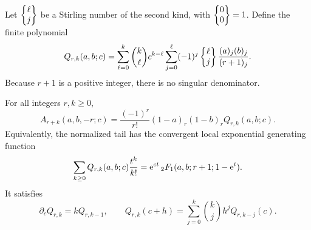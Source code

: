 Let $\left\{\begin{matrix}\ell\\j\end{matrix}\right\}$ be a Stirling number of the second kind, with
$\left\{\begin{matrix}0\\0\end{matrix}\right\}=1$. Define the finite polynomial
\begin{equation}\label{agrc:Q-definition}
 Q_{r,k}(a,b;c)=\sum_{\ell=0}^k\binom{k}{\ell}c^{k-\ell}
       \sum_{j=0}^{\ell}(-1)^j\left\{\begin{matrix}\ell\\j\end{matrix}\right\}
                 \frac{(a)_j(b)_j}{(r+1)_j}.
\end{equation}
Because $r+1$ is a positive integer, there is no singular denominator.

\begin{theorem}
\label{agrc:tail}
For all integers $r,k\geq0$,
\begin{equation}\label{agrc:tail-formula}
 \boxed{\displaystyle
 A_{r+k}(a,b,-r;c)=
 \frac{(-1)^r}{r!}(1-a)_r(1-b)_r Q_{r,k}(a,b;c).}
\end{equation}
Equivalently, the normalized tail has the convergent local exponential
 generating function
\begin{equation}\label{agrc:tail-hypergeometric}
 \sum_{k\geq0}Q_{r,k}(a,b;c)\frac{t^k}{k!}
       =\mathrm e^{ct}\,{}_2F_1(a,b;r+1;1-\mathrm e^t).
\end{equation}
It satisfies
\begin{equation}\label{agrc:Appell}
 \partial_c Q_{r,k}=kQ_{r,k-1},\qquad
 Q_{r,k}(c+h)=\sum_{j=0}^k\binom{k}{j}h^jQ_{r,k-j}(c).
\end{equation}
\end{theorem}
